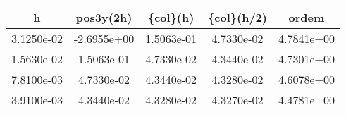 \begin{table}[htb]
    \centering
    \begin{tabular}{@{}ccccc@{}}
        \toprule
        h & pos3y(2h) & \{col\}(h) & \{col\}(h/2) & ordem \\ \hline
        \midrule
        3.1250e-02 & -2.6955e+00 & 1.5063e-01 & 4.7330e-02 & 4.7841e+00 \\ \hline
        1.5630e-02 & 1.5063e-01 & 4.7330e-02 & 4.3440e-02 & 4.7301e+00 \\ \hline
        7.8100e-03 & 4.7330e-02 & 4.3440e-02 & 4.3280e-02 & 4.6078e+00 \\ \hline
        3.9100e-03 & 4.3440e-02 & 4.3280e-02 & 4.3270e-02 & 4.4781e+00 \\ \hline
        \bottomrule
    \end{tabular}
\end{table}
